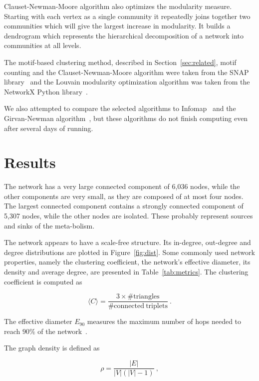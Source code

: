 Clauset-Newman-Moore algorithm also optimizes the modularity measure. Starting
with each vertex as a single community it repeatedly joins together two
communities which will give the largest increase in modularity. It builds a
dendrogram which represents the hierarchical decomposition of a network into
communities at all levels.

The motif-based clustering method, described in Section~\ref{sec:related}, motif
counting and the Clauset-Newman-Moore algorithm were taken from the SNAP
library~\cite{leskovec2016snap} and the Louvain modularity optimization
algorithm was taken from the NetworkX Python library~\cite{networkx}.

We also attempted to compare the selected algorithms to
Infomap~\cite{rosvall2008maps} and the Girvan-Newman
algorithm~\cite{girvan2002community}, but these algorithms do not finish
computing even after several days of running.

\section{Results}
\label{sec:results}

The network has a very large connected component of 6,036 nodes, while the other
components are very small, as they are composed of at most four nodes. The
largest connected component contains a strongly connected component of 5,307
nodes, while the other nodes are isolated. These probably represent sources and
sinks of the meta-bolism.

The network appears to have a scale-free structure. Its in-degree, out-degree
and degree distributions are plotted in Figure~\ref{fig:dist}. Some commonly
used network properties, namely the clustering coefficient, the network's
effective diameter, its density and average degree, are presented in
Table~\ref{tab:metrics}. The clustering coefficient is computed as

\begin{equation}
  \langle C \rangle = \frac{3 \times \mathrm{\# triangles}}{\mathrm{\# connected
  \ triplets}}\ .
\end{equation}

The effective diameter $E_{90}$ measures the maximum number of hops needed to
reach $90\%$ of the network~\cite{leskovec2007graph}.

The graph density is defined as

\begin{equation}
  \rho = \frac{|E|}{|V|(|V| - 1)}\ ,
\end{equation}


